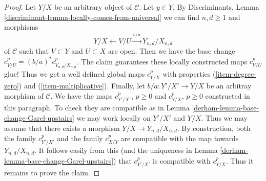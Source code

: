\begin{proof}
\medskip\noindent
Let $Y/X$ be an arbitrary object of $\mathcal{C}$. Let $y \in Y$.
By Discriminants, Lemma \ref{discriminant-lemma-locally-comes-from-universal}
we can find $n, d \geq 1$ and morphisms
$$
Y/X \leftarrow V/U \xrightarrow{b/a} Y_{n, d}/X_{n, d}
$$
of $\mathcal{C}$ such that $V \subset Y$ and $U \subset X$ are open.
Then we have the base change $c^p_{V/U} = (b/a)^*c^p_{Y_{n, d}/X_{n, d}}$.
The claim guarantees these locally constructed maps $c^p_{V/U}$ glue!
Thus we get a well defined global maps $c^p_{Y/X}$ with properties
(\ref{item-degree-zero}) and (\ref{item-multiplicative}).
Finally, let $b/a : Y'/X' \to Y/X$ be an arbitray morphism of $\mathcal{C}$.
We have the maps $c^p_{Y'/X'}$, $p \geq 0$ and $c^p_{Y/X}$, $p \geq 0$
constructed in this paragraph. To check they are compatible as in
Lemma \ref{derham-lemma-base-change-Garel-upstairs} we may work locally
on $Y'/X'$ and $Y/X$. Thus we may assume that there exists a morphism
$Y/X \to Y_{n, d}/X_{n, d}$. By construction, both the family
$c^p_{Y'/X'}$ and the family $c^p_{X/Y}$ are compatible with
the map towards $Y_{n, d}/X_{n, d}$. It follows easily from this
(and the uniqueness in Lemma \ref{derham-lemma-base-change-Garel-upstairs})
that $c^p_{Y'/X'}$ is compatible with $c^p_{Y/X}$.
Thus it remains to prove the claim.


\end{proof}
